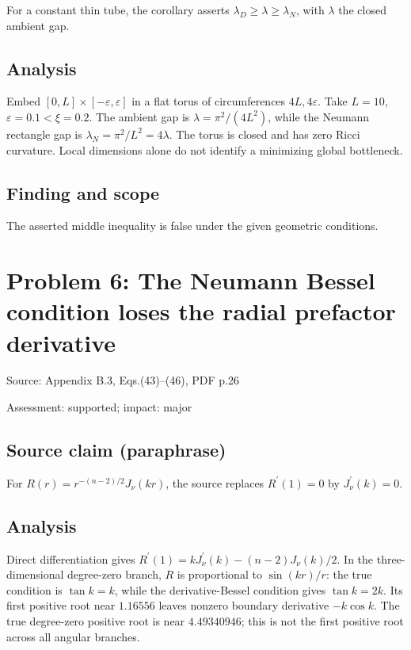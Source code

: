 \documentclass[11pt]{article}
\begin{document}
For a constant thin tube, the corollary asserts \(\lambda_D\ge\lambda\ge\lambda_N\), with \(\lambda\) the closed ambient gap.

\subsection*{Analysis}

Embed \([0,L]\times[-\varepsilon,\varepsilon]\) in a flat torus of circumferences \(4L,4\varepsilon\). Take \(L=10\), \(\varepsilon=0.1<\xi=0.2\). The ambient gap is \(\lambda=\pi^2/(4L^2)\), while the Neumann rectangle gap is \(\lambda_N=\pi^2/L^2=4\lambda\). The torus is closed and has zero Ricci curvature. Local dimensions alone do not identify a minimizing global bottleneck.

\subsection*{Finding and scope}

The asserted middle inequality is false under the given geometric conditions.

\section*{Problem 6: The Neumann Bessel condition loses the radial prefactor derivative}

Source: Appendix B.3, Eqs.(43)–(46), PDF p.26

Assessment: supported; impact: major

\subsection*{Source claim (paraphrase)}

For \(R(r)=r^{-(n-2)/2}J_\nu(kr)\), the source replaces \(R^{\prime}(1)=0\) by \(J_\nu^{\prime}(k)=0\).

\subsection*{Analysis}

Direct differentiation gives \(R^{\prime}(1)=kJ_\nu^{\prime}(k)-(n-2)J_\nu(k)/2\). In the three-dimensional degree-zero branch, \(R\) is proportional to \(\sin(kr)/r\): the true condition is \(\tan k=k\), while the derivative-Bessel condition gives \(\tan k=2k\). Its first positive root near \(1.16556\) leaves nonzero boundary derivative \(-k\cos k\). The true degree-zero positive root is near \(4.49340946\); this is not the first positive root across all angular branches.
\end{document}
